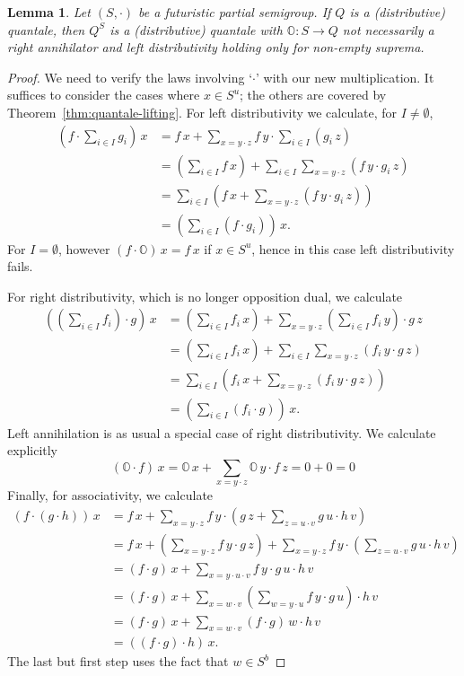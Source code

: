\documentclass[12pt]{article}
\newtheorem{lemma}{Lemma}
\theoremstyle{definition}
\newcommand{\zero}{\mathbb{O}}
\begin{document}
\begin{lemma}
  \label{lem:futuristic-quantale}
  Let $(S,\cdot)$ be a futuristic partial semigroup. If $Q$ is a
  (distributive) quantale, then $Q^S$ is a (distributive) quantale
  with $\zero:S\to Q$ not necessarily a right annihilator and left
  distributivity holding only for non-empty suprema.
\end{lemma}
\begin{proof}
  We need to verify the laws involving `$\cdot$' with our new
  multiplication. It suffices to consider the cases where $x\in S^u$;
  the others are covered by Theorem~\ref{thm:quantale-lifting}. For
  left distributivity we calculate, for $I\neq\emptyset$, 
  \begin{align*}
    (f\cdot \sum_{i\in I}g_i)\, x & = f\, x + \sum_{x=y\cdot z} f\, y\cdot \sum_{i\in I}(g_i\, z)\\ 
&= (\sum_{i\in I} f\, x) + \sum_{i\in I}\sum_{x=y\cdot z} (f\, y\cdot g_i\, z)\\
&= \sum_{i\in I} (f\, x + \sum_{x=y\cdot z} (f\, y\cdot g_i\, z))\\
&= (\sum_{i\in I} (f\cdot g_i))\, x.
  \end{align*}
  For $I=\emptyset$, however $(f\cdot \zero)\, x = f\, x$ if $x\in
  S^u$, hence in this case left distributivity fails.

  For right distributivity, which is no longer opposition dual, we
  calculate
  \begin{align*}
    ((\sum_{i\in I}f_i)\cdot g)\, x &= (\sum_{i\in I} f_i\, x) + \sum_{x=y\cdot z} (\sum_{i\in I} f_i\, y)\cdot g\, z\\
&= (\sum_{i\in I} f_i\, x) + \sum_{i\in I}\sum_{x=y\cdot z} (f_i\, y\cdot g\, z)\\
&= \sum_{i\in I} (f_i\, x + \sum_{x=y\cdot z} (f_i\, y\cdot g\, z))\\
&=(\sum_{i\in I} (f_i\cdot g))\, x.
  \end{align*}
  Left annihilation is as usual a special case of right
  distributivity. We calculate explicitly
\begin{equation*}
  (\zero\cdot f)\, x = \zero\, x + \sum_{x=y\cdot z} \zero\,
  y\cdot f\, z= 0+0=0 
\end{equation*}
Finally, for associativity, we calculate
    \begin{align*}
      (f\cdot (g\cdot h))\,x 
&= f\,x + \sum_{x=y\cdot z} f\,y\cdot (g\,z + \sum_{z=u\cdot v} g\,u\cdot h\,v)\\
&= f\,x + (\sum_{x=y\cdot z} f\,y\cdot g\,z) + \sum_{x = y \cdot z} f\, y \cdot (\sum_{z=u \cdot v} g\,u\cdot h\,v)\\
&= (f\cdot g)\,x + \sum_{x=y \cdot u \cdot v} f\,y\cdot g\,u \cdot h\,v\\
&= (f\cdot g)\,x + \sum_{x=w \cdot v} (\sum_{w = y \cdot u} f\,y \cdot g\,u) \cdot h\,v\\
&= (f\cdot g)\,x + \sum_{x=w\cdot v}(f\cdot g)\,w \cdot h\,v\\
&= ((f\cdot g)\cdot h)\,x.
    \end{align*}
The last but first step uses the fact that $w\in S^b$
\end{proof}
\end{document}
